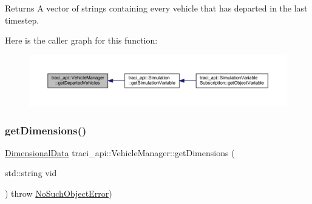 \begin{DoxyReturn}{Returns}
A vector of strings containing every vehicle that has departed in the last timestep. 
\end{DoxyReturn}
Here is the caller graph for this function\+:
\nopagebreak
\begin{figure}[H]
\begin{center}
\leavevmode
\includegraphics[width=350pt]{classtraci__api_1_1_vehicle_manager_ae88de975fe459842df9a412c552641ea_icgraph}
\end{center}
\end{figure}
\mbox{\label{classtraci__api_1_1_vehicle_manager_a626f8aea7366479ec9bdd49f58f5b530}} 
\subsubsection{\texorpdfstring{get\+Dimensions()}{getDimensions()}}
{\footnotesize\ttfamily \hyperlink{class_dimensional_data}{Dimensional\+Data} traci\+\_\+api\+::\+Vehicle\+Manager\+::get\+Dimensions (\begin{DoxyParamCaption}\item[{std\+::string}]{vid }\end{DoxyParamCaption}) throw  \hyperlink{classtraci__api_1_1_no_such_object_error}{No\+Such\+Object\+Error}) }

